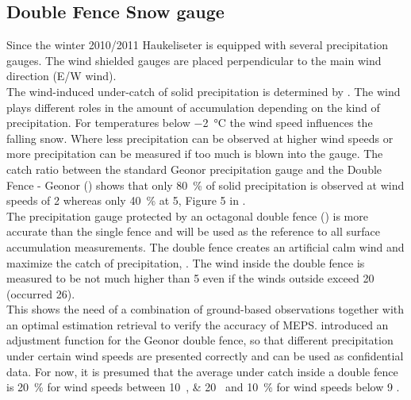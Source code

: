 \subsection{Double Fence Snow gauge}\label{sec:dofe}

Since the winter 2010/2011 Haukeliseter is equipped with several precipitation gauges. The wind shielded gauges are placed perpendicular to the main wind direction (E/W wind).
\\
The wind-induced under-catch of solid precipitation is determined by \citet{wolff_derivation_2015}. The wind plays different roles in the amount of accumulation depending on the kind of precipitation. For temperatures below \SI{-2}{\celsius} the wind speed influences the falling snow. Where less precipitation can be observed at higher wind speeds or more precipitation can be measured if too much is blown into the gauge. The catch ratio between the standard Geonor precipitation gauge and the Double Fence - Geonor () shows that only \SI{80}{\percent} of solid precipitation is observed at wind speeds of \SI{2}{\mPs} whereas only \SI{40}{\percent} at \SI{5}{\mPs}, Figure 5 in \citet{wolff_derivation_2015}. 
\\
The precipitation gauge protected by an octagonal double fence () is more accurate than the single fence and will be used as the reference to all surface accumulation measurements. The double fence creates an artificial calm wind and maximize the catch of precipitation, \citep{wolff_new_2010, wolff_measurements_2013, wolff_derivation_2015}. The wind inside the double fence is measured to be not much higher than \SI{5}{\mPs} even if the winds outside exceed \SI{20}{\mPs} (occurred \SI{26}{\dec}). %
\\
This shows the need of a combination of ground-based observations together with an optimal estimation retrieval to verify the accuracy of MEPS. \citet{wolff_derivation_2015} introduced an adjustment function for the Geonor double fence, so that different precipitation under certain wind speeds are presented correctly and can be used as confidential data. 
For now, it is presumed that the average under catch inside a double fence is \SI{20}{\percent} for wind speeds between \SIlist{10;20}{\mPs} and \SI{10}{\percent} for wind speeds below \SI{9}{\mPs} \citep{wolff_wmo_2018}.
